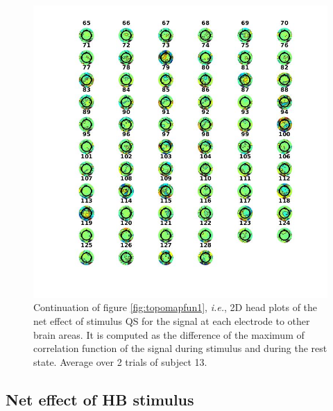 \documentclass[a4paper]{article}
\begin{document}
\begin{figure}
    \centering
    \includegraphics[width=16cm]{QS2.jpg}
    \caption{Continuation of figure \ref{fig:topomapfun1}, \textit{i.e.}, 2D head plots of the net effect of stimulus QS for the signal at each electrode to other brain areas. It is computed as the difference of the maximum of correlation function of the signal during stimulus and during the rest state. Average over 2 trials of subject 13.}
    \label{fig:qs2}
\end{figure}

\subsection{Net effect of HB stimulus}
\end{document}
